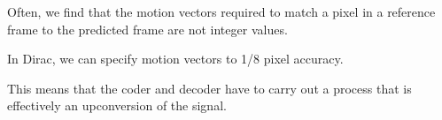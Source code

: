 Often, we find that the motion vectors required to match a pixel in a
reference frame to the predicted frame are not integer values.

In Dirac, we can specify motion vectors to 1/8 pixel accuracy.

This means that the coder and decoder have to carry out a process that
is effectively an upconversion of the signal.

